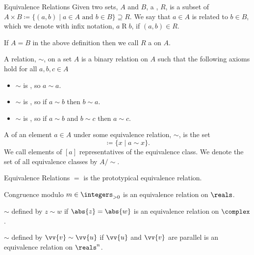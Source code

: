\begin{dfn}{Equivalence Relations}{}
    Given two sets, \(A\) and \(B\), a , \(R\), is a subset of \(A \times B \coloneqq \{(a, b) \mid a \in A \text{ and } b \in B\} \supseteq R\).
    We say that \(a \in A\) is related to \(b \in B\), which we denote with infix notation, \(a\mathbin{R}b\), if \((a, b) \in R\).
    
    If \(A = B\) in the above definition then we call \(R\) a  on \(A\).
    
    A relation, \(\sim\), on a set \(A\) is a binary relation on \(A\) such that the following axioms hold for all \(a, b, c \in A\)
    \begin{itemize}
        \item \(\sim\) is , so \(a \sim a\).
        \item \(\sim\) is , so if \(a \sim b\) then \(b \sim a\).
        \item \(\sim\) is , so if \(a \sim b\) and \(b \sim c\) then \(a \sim c\).
    \end{itemize}
    
    A  of an element \(a \in A\) under some equivalence relation, \(\sim\), is the set
    \begin{equation}
        [a] \coloneqq \{x \mid a \sim x\}.
    \end{equation}
    We call elements of \([a]\) representatives of the equivalence class.
    We denote the set of all equivalence classes by \(A/\sim\).
\end{dfn}

\begin{exm}{Equivalence Relations}{}
    \(=\) is the prototypical equivalence relation.
    
    Congruence modulo \(m \in \positiveintegers\) is an equivalence relation on \(\reals\).
    
    \(\sim\) defined by \(z\sim w\) if \(\abs{z} = \abs{w}\) is an equivalence relation on \(\complex\).
    
    \(\sim\) defined by \(\vv{v} \sim \vv{u}\) if \(\vv{u}\) and \(\vv{v}\) are parallel is an equivalence relation on \(\reals^n\).
\end{exm}


